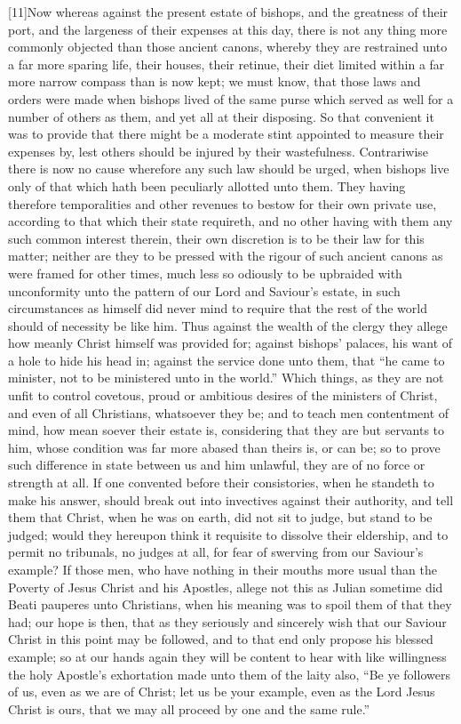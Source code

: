 [11]Now whereas against the present estate of bishops, and the greatness of their port, and the largeness of their expenses at this day, there is not any thing more commonly objected than those ancient canons, whereby they are restrained unto a far more sparing life, their houses, their retinue, their diet limited within a far more narrow compass than is now kept; we must know, that those laws and orders were made when bishops lived of the same purse which served as well for a number of others as them, and yet all at their disposing. So that convenient it was to provide that there might be a moderate stint appointed to measure their expenses by, lest others should be injured by their wastefulness. Contrariwise there is now no cause wherefore any such law should be urged, when bishops live only of that which hath been peculiarly allotted unto them. They having therefore temporalities and other revenues to bestow for their own private use, according to that which their state requireth, and no  other having with them any such common interest therein, their own discretion is to be their law for this matter; neither are they to be pressed with the rigour of such ancient canons as were framed for other times, much less so odiously to be upbraided with unconformity unto the pattern of our Lord and Saviour’s estate, in such circumstances as himself did never mind to require that the rest of the world should of necessity be like him. Thus against the wealth of the clergy they allege how meanly Christ himself was provided for; against bishops’ palaces, his want of a hole to hide his head in; against the service done unto them, that “he came to minister, not to be ministered unto in the world.” Which things, as they are not unfit to control covetous, proud or ambitious desires of the ministers of Christ, and even of all Christians, whatsoever they be; and to teach men contentment of mind, how mean soever their estate is, considering that they are but servants to him, whose condition was far more abased than theirs is, or can be; so to prove such difference in state between us and him unlawful, they are of no force or strength at all. If one convented before their consistories, when he standeth to make his answer, should break out into invectives against their authority, and tell them that Christ, when he was on earth, did not sit to judge, but stand to be judged; would they hereupon think it requisite  to dissolve their eldership, and to permit no tribunals, no judges at all, for fear of swerving from our Saviour’s example? If those men, who have nothing in their mouths more usual than the Poverty of Jesus Christ and his Apostles, allege not this as Julian sometime did Beati pauperes unto Christians, when his meaning was to spoil them of that they had; our hope is then, that as they seriously and sincerely wish that our Saviour Christ in this point may be followed, and to that end only propose his blessed example; so at our hands again they will be content to hear with like willingness the holy Apostle’s exhortation made unto them of the laity also, “Be ye followers of us, even as we are of Christ; let us be your example, even as the Lord Jesus Christ is ours, that we may all proceed by one and the same rule.”

